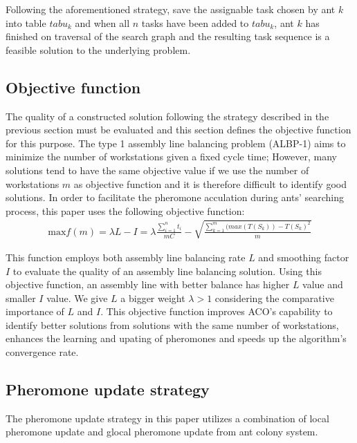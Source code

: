 Following the aforementioned strategy, save the assignable task chosen by ant $k$ into table $tabu_k$ and when all $n$ tasks have been added to $tabu_k$, ant $k$ has finished on traversal of the search graph and the resulting task sequence is a feasible solution to the underlying problem.

\subsection{Objective function}
The quality of a constructed solution following the strategy described in the previous section must be evaluated and this section defines the objective function for this purpose.
The type 1 assembly line balancing problem (ALBP-1) aims to minimize the number of workstations given a fixed cycle time; However, many solutions tend to have the same objective value if we use the number of workstations $m$ as objective function and it is therefore difficult to identify good solutions.
In order to facilitate the pheromone acculation during ants' searching process, this paper uses the following objective function:
\begin{align}
	\text{max} f(m) = \lambda L - I 
	= \lambda \frac{\sum_{i = 1}^{n} t_i}{mC} - \sqrt{\frac{\sum_{k=1}^m (max(T(S_k)) - T(S_k)^2}{m}} \label{formula8}
\end{align}

This function employs both assembly line balancing rate $L$ and smoothing factor $I$ to evaluate the quality of an assembly line balancing solution.
Using this objective function, an assembly line with better balance has higher $L$ value and smaller $I$ value.
We give $L$ a bigger weight $\lambda > 1$ considering the comparative importance of $L$ and $I$. 
This objective function improves ACO's capability to identify better solutions from solutions with the same number of workstations, enhances the learning and upating of pheromones and speeds up the algorithm's convergence rate. 




\subsection{Pheromone update strategy}
The pheromone update strategy in this paper utilizes a combination of local pheromone update and glocal pheromone update from ant colony system.

